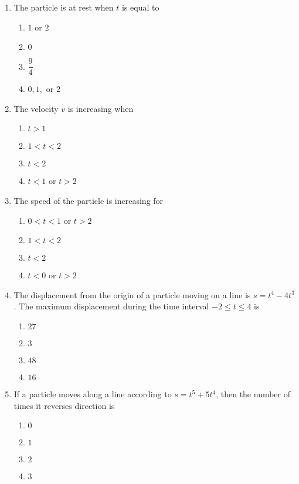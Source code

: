 \documentclass[12pt]{article}
\begin{document}
\begin{enumerate}[label=\textbf{A\arabic*.},resume]

\item The particle is at rest when $t$ is equal to
\begin{enumerate}[label=(\Alph*)]
\item $1$ or $2$ \item $0$ \item $\dfrac{9}{4}$ \item $0,1,$ or $2$
\end{enumerate}

\item The velocity $v$ is increasing when
\begin{enumerate}[label=(\Alph*)]
\item $t>1$ \item $1<t<2$ \item $t<2$ \item $t<1$ or $t>2$
\end{enumerate}

\item The speed of the particle is increasing for
\begin{enumerate}[label=(\Alph*)]
\item $0<t<1$ or $t>2$ \item $1<t<2$ \item $t<2$ \item $t<0$ or $t>2$
\end{enumerate}

\item The displacement from the origin of a particle moving on a line is $s=t^{4}-4t^{3}$. The maximum displacement during the time interval $-2\le t\le 4$ is
\begin{enumerate}[label=(\Alph*)]
\item $27$ \item $3$ \item $48$ \item $16$
\end{enumerate}

\item If a particle moves along a line according to $s=t^{5}+5t^{4}$, then the number of times it reverses direction is
\begin{enumerate}[label=(\Alph*)]
\item $0$ \item $1$ \item $2$ \item $3$
\end{enumerate}

\end{enumerate}
\end{document}
